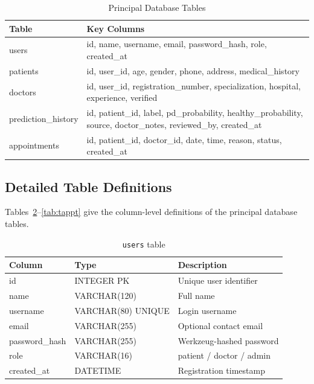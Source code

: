 \documentclass[oneside,a4paper,12pt]{report}
\begin{document}
\begin{table}[H]
\centering
\caption{Principal Database Tables}
\label{tab:schema}
\def\arraystretch{1.25}
\begin{tabularx}{\textwidth}{|l|X|}
\hline
\textbf{Table} & \textbf{Key Columns} \\ \hline
users & id, name, username, email, password\_hash, role, created\_at \\ \hline
patients & id, user\_id, age, gender, phone, address, medical\_history \\ \hline
doctors & id, user\_id, registration\_number, specialization, hospital, experience, verified \\ \hline
prediction\_history & id, patient\_id, label, pd\_probability, healthy\_probability, source, doctor\_notes, reviewed\_by, created\_at \\ \hline
appointments & id, patient\_id, doctor\_id, date, time, reason, status, created\_at \\ \hline
\end{tabularx}
\end{table}

\subsection{Detailed Table Definitions}
Tables~\ref{tab:tusers}--\ref{tab:tappt} give the column-level definitions of the
principal database tables.

\begin{table}[H]
\centering
\caption{\texttt{users} table}
\label{tab:tusers}
\def\arraystretch{1.2}
\begin{tabularx}{\textwidth}{|l|l|X|}
\hline
\textbf{Column} & \textbf{Type} & \textbf{Description} \\ \hline
id & INTEGER PK & Unique user identifier \\ \hline
name & VARCHAR(120) & Full name \\ \hline
username & VARCHAR(80) UNIQUE & Login username \\ \hline
email & VARCHAR(255) & Optional contact email \\ \hline
password\_hash & VARCHAR(255) & Werkzeug-hashed password \\ \hline
role & VARCHAR(16) & patient / doctor / admin \\ \hline
created\_at & DATETIME & Registration timestamp \\ \hline
\end{tabularx}
\end{table}
\end{document}
